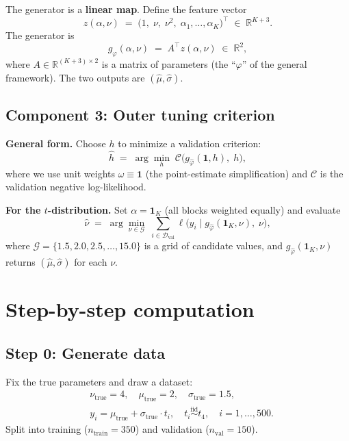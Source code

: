 \documentclass[12pt]{article}
\begin{document}
The generator is a \textbf{linear map}.  Define the feature vector
\[
z(\alpha,\nu) \;=\; \bigl(1,\;\nu,\;\nu^2,\;\alpha_1,\ldots,\alpha_K\bigr)^\top \;\in\;\mathbb{R}^{K+3}.
\]
The generator is
\[
g_\varphi(\alpha,\nu) \;=\; A^\top z(\alpha,\nu) \;\in\;\mathbb{R}^2,
\]
where $A\in\mathbb{R}^{(K+3)\times 2}$ is a matrix of parameters (the ``$\varphi$'' of the general framework).  The two outputs are $(\hat\mu, \hat\sigma)$.

\subsection{Component 3: Outer tuning criterion}

\textbf{General form.}  Choose $h$ to minimize a validation criterion:
\begin{equation}
\label{eq:outer}
\hat h \;=\; \arg\min_h\; \mathcal{C}\!\bigl(g_{\hat\varphi}(\mathbf{1},h),\;h\bigr),
\end{equation}
where we use unit weights $\omega\equiv\mathbf{1}$ (the point-estimate simplification) and $\mathcal{C}$ is the validation negative log-likelihood.

\textbf{For the $t$-distribution.}  Set $\alpha = \mathbf{1}_K$ (all blocks weighted equally) and evaluate
\begin{equation}
\label{eq:outer-t}
\hat\nu \;=\; \arg\min_{\nu\in\mathcal{G}}\; \sum_{i\in\mathcal{D}_{\mathrm{val}}} \ell\!\bigl(y_i \mid g_{\hat\varphi}(\mathbf{1}_K,\nu),\;\nu\bigr),
\end{equation}
where $\mathcal{G} = \{1.5, 2.0, 2.5, \ldots, 15.0\}$ is a grid of candidate values, and $g_{\hat\varphi}(\mathbf{1}_K,\nu)$ returns $(\hat\mu,\hat\sigma)$ for each $\nu$.

\section{Step-by-step computation}

\subsection{Step 0: Generate data}

Fix the true parameters and draw a dataset:
\begin{align*}
&\nu_{\mathrm{true}} = 4, \quad \mu_{\mathrm{true}} = 2, \quad \sigma_{\mathrm{true}} = 1.5,\\
&y_i = \mu_{\mathrm{true}} + \sigma_{\mathrm{true}} \cdot t_i, \quad t_i \stackrel{\mathrm{iid}}{\sim} t_4, \quad i=1,\ldots,500.
\end{align*}
Split into training ($n_{\mathrm{train}}=350$) and validation ($n_{\mathrm{val}}=150$).
\end{document}
